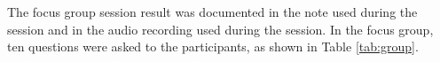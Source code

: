 \documentclass[conference]{IEEEtran}
\begin{document}

The focus group session result was documented in the note used during the session and in the audio recording used during the session. In the focus group, ten questions were asked to the participants, as shown in Table \ref{tab:group}.

\end{document}
